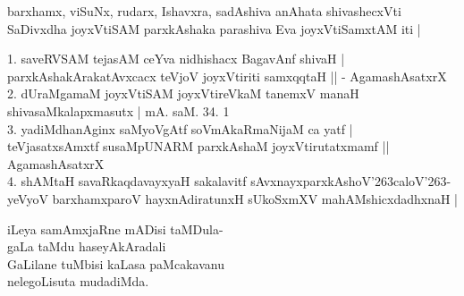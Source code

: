 \begin{entry}

\smallskip
\begin{shl}
barxhamx, viSuNx, rudarx, Ishavxra, sadAshiva anAhata shivashecxVti\\
SaDivxdha joyxVtiSAM parxkAshaka parashiva Eva joyxVtiSamxtAM iti |
\end{shl}
\smallskip
\begin{shl}
1. saveRVSAM tejasAM ceYva nidhishacx BagavAnf shivaH |\\
parxkAshakArakatAvxcacx teVjoV joyxVtiriti samxqqtaH || - AgamashAsatxrX\\
2. dUraMgamaM joyxVtiSAM joyxVtireVkaM tanemxV manaH shivasaMkalapxmasutx | mA. saM. 34. 1\\
3. yadiMdhanAginx saMyoVgAtf soVmAkaRmaNijaM ca yatf |\\
teVjasatxsAmxtf susaMpUNARM parxkAshaM joyxVtirutatxmamf || AgamashAsatxrX\\
4. shAMtaH savaRkaqdavayxyaH sakalavitf sAvxnayxparxkAshoV\char'263caloV\char'263-\\
yeVyoV barxhamxparoV hayxnAdiratunxH sUkoSxmXV mahAMshicxdadhxnaH |
\end{shl}
\medskip
{}
\end{entry}

\begin{entry}

\smallskip
\begin{shl}
iLeya samAmxjaRne mADisi taMDula-\\
gaLa taMdu haseyAkAradali\\
GaLilane tuMbisi kaLasa paMcakavanu\\
nelegoLisuta mudadiMda.
\end{shl}
\end{entry}

